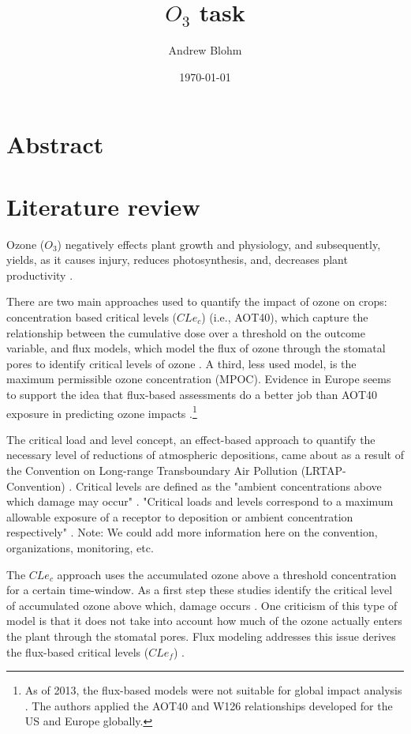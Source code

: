 \documentclass[10pt]{amsart}
\title{$O_{3}$ task}
\author{Andrew Blohm}
\date{\today}
\begin{document}
\maketitle

\section{Abstract}

\section{Literature review}
Ozone ($O_{3}$) negatively effects plant growth and physiology, and subsequently, yields, as it causes injury, reduces photosynthesis, and, decreases plant productivity \parencite{mishra:2013aa}. 

There are two main approaches used to quantify the impact of ozone on crops: concentration based critical levels ($CLe_{c}$) (i.e., AOT40), which capture the relationship between the cumulative dose over a threshold on the outcome variable, and flux models, which model the flux of ozone through the stomatal pores to identify critical levels of ozone \parencite{mills:2007aa}. 
A third, less used model, is the maximum permissible ozone concentration (MPOC)\parencite{mills:2007aa}.  
Evidence in Europe seems to support the idea that flux-based assessments do a better job than AOT40 exposure in predicting ozone impacts \parencite{avnery:2013ab}.\footnote{As of 2013, the flux-based models were not suitable for global impact analysis \parencite{avnery:2013ab}. The authors applied the AOT40 and W126 relationships developed for the US and Europe globally.} 

The critical load and level concept, an effect-based approach to quantify the necessary level of reductions of atmospheric depositions, came about as a result of the Convention on Long-range Transboundary Air Pollution (LRTAP-Convention) \parencite{clrtap:2015aa}. 
Critical levels are defined as the "ambient concentrations above which damage may occur" \parencite[I-5]{clrtap:2015aa}.
"Critical loads and levels correspond to a maximum allowable exposure of a receptor to deposition or ambient concentration respectively" \parencite[I-5]{clrtap:2015aa}.
Note: We could add more information here on the convention, organizations, monitoring, etc. 

The $CLe_{c}$ approach uses the accumulated ozone above a threshold concentration for a certain time-window. 
As a first step these studies identify the critical level of accumulated ozone above which, damage occurs \parencite{mills:2007aa}.
One criticism of this type of model is that it does not take into account how much of the ozone actually enters the plant through the stomatal pores.
Flux modeling addresses this issue derives the flux-based critical levels ($CLe_{f}$) \parencite{mills:2007aa}.  
\end{document}
